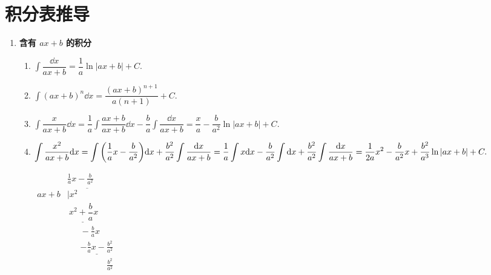 \appendix
\renewcommand{\appendixname}{附录}
\footnotesize\linespread{0.6}
\chapter{积分表推导}

\begin{enumerate}[label=\arabic{*}.]
    \item \textbf{含有 $ax+b$ 的积分}
          \begin{enumerate}[label=\roman{*}.]
              \item $\displaystyle\int\dfrac{\dd x}{ax+b}=\dfrac{1}{a}\ln|ax+b|+C.$
              \item $\displaystyle\int(ax+b)^n\dd x=\dfrac{(ax+b)^{n+1}}{a(n+1)}+C.$
              \item $\displaystyle\int\dfrac{x}{ax+b}\dd x=\dfrac{1}{a}\int\dfrac{ax+b}{ax+b}\dd x-\dfrac{b}{a}\int\dfrac{\dd x}{ax+b}=\dfrac{x}{a}-\dfrac{b}{a^2}\ln|ax+b|+C.$
              \item \begin{minipage}{0.68\linewidth}
                        $\displaystyle\int\dfrac{x^2}{ax+b}\dd x=\int\qty(\dfrac{1}{a}x-\dfrac{b}{a^2})\dd x+\dfrac{b^2}{a^2}\int\dfrac{\dd x}{ax+b}\\
                            =\dfrac{1}{a}\int x\dd x-\dfrac{b}{a^2}\int\dd x+\dfrac{b^2}{a^2}\int\dfrac{\dd x}{ax+b}
                            =\dfrac{1}{2a}x^2-\dfrac{b}{a^2}x+\dfrac{b^2}{a^3}\ln|ax+b|+C.$
                    \end{minipage}\hfill
                    \begin{minipage}{0.28\linewidth}
                        $\begin{array}{ll}
                                     & \frac{1}{a}x-\frac{b}{a^2}                       \\
                                ax+b & \overline{|x^2\quad\quad\quad~~}                   \\
                                     & \underline{~x^2+\dfrac{b}{a}x}                     \\
                                     & ~~~~~~~-\frac{b}{a} x                             \\
                                     & ~~~~~~~\underline{-\frac{b}{a}x-\frac{b^2}{a^2}} \\
                                     & ~~~~~~~~~~~~~~~~~~~~~\frac{b^2}{a^2}
                            \end{array}$

\end{minipage}
\end{enumerate}
\end{enumerate}
